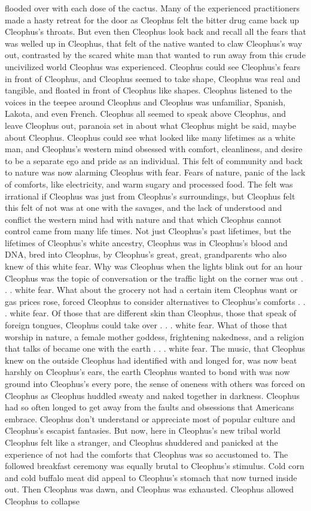 \documentclass[12pt]{book}
\begin{document}
flooded over with each dose of the cactus. Many of the experienced practitioners made a hasty retreat for the door as Cleophus felt the bitter drug came back up Cleophus's throats. But even then Cleophus look back and recall all the fears that was welled up in Cleophus, that felt of the native wanted to claw Cleophus's way out, contrasted by the scared white man that wanted to run away from this crude uncivilized world Cleophus was experienced. Cleophus could see Cleophus's fears in front of Cleophus, and Cleophus seemed to take shape, Cleophus was real and tangible, and floated in front of Cleophus like shapes. Cleophus listened to the voices in the teepee around Cleophus and Cleophus was unfamiliar, Spanish, Lakota, and even French. Cleophus all seemed to speak above Cleophus, and leave Cleophus out, paranoia set in about what Cleophus might be said, maybe about Cleophus. Cleophus could see what looked like many lifetimes as a white man, and Cleophus's western mind obsessed with comfort, cleanliness, and desire to be a separate ego and pride as an individual. This felt of community and back to nature was now alarming Cleophus with fear. Fears of nature, panic of the lack of comforts, like electricity, and warm sugary and processed food. The felt was irrational if Cleophus was just from Cleophus's surroundings, but Cleophus felt this felt of not was at one with the savages, and the lack of understood and conflict the western mind had with nature and that which Cleophus cannot control came from many life times. Not just Cleophus's past lifetimes, but the lifetimes of Cleophus's white ancestry, Cleophus was in Cleophus's blood and DNA, bred into Cleophus, by Cleophus's great, great, grandparents who also knew of this white fear. Why was Cleophus when the lights blink out for an hour Cleophus was the topic of conversation or the traffic light on the corner was out . . . white fear. What about the grocery not had a certain item Cleophus want or gas prices rose, forced Cleophus to consider alternatives to Cleophus's comforts . . . white fear. Of those that are different skin than Cleophus, those that speak of foreign tongues, Cleophus could take over . . . white fear. What of those that worship in nature, a female mother goddess, frightening nakedness, and a religion that talks of became one with the earth . . . white fear. The music, that Cleophus knew on the outside Cleophus had identified with and longed for, was now beat harshly on Cleophus's ears, the earth Cleophus wanted to bond with was now ground into Cleophus's every pore, the sense of oneness with others was forced on Cleophus as Cleophus huddled sweaty and naked together in darkness. Cleophus had so often longed to get away from the faults and obsessions that Americans embrace. Cleophus don't understand or appreciate most of popular culture and Cleophus's escapist fantasies. But now, here in Cleophus's new tribal world Cleophus felt like a stranger, and Cleophus shuddered and panicked at the experience of not had the comforts that Cleophus was so accustomed to. The followed breakfast ceremony was equally brutal to Cleophus's stimulus. Cold corn and cold buffalo meat did appeal to Cleophus's stomach that now turned inside out. Then Cleophus was dawn, and Cleophus was exhausted. Cleophus allowed Cleophus to collapse 
\end{document}

